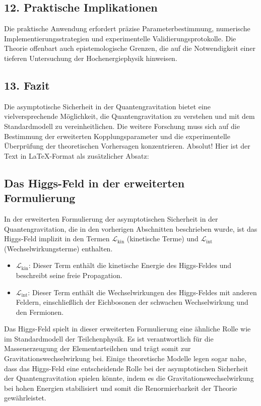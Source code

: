 \documentclass{article}
\begin{document}
\subsection{12. Praktische Implikationen}

Die praktische Anwendung erfordert präzise Parameterbestimmung, numerische Implementierungsstrategien und experimentelle Validierungsprotokolle. Die Theorie offenbart auch epistemologische Grenzen, die auf die Notwendigkeit einer tieferen Untersuchung der Hochenergiephysik hinweisen.

\subsection{13. Fazit}

Die asymptotische Sicherheit in der Quantengravitation bietet eine vielversprechende Möglichkeit, die Quantengravitation zu verstehen und mit dem Standardmodell zu vereinheitlichen. Die weitere Forschung muss sich auf die Bestimmung der erweiterten Kopplungsparameter und die experimentelle Überprüfung der theoretischen Vorhersagen konzentrieren.
Absolut! Hier ist der Text in LaTeX-Format als zusätzlicher Absatz:

\subsection{Das Higgs-Feld in der erweiterten Formulierung}

In der erweiterten Formulierung der asymptotischen Sicherheit in der Quantengravitation, die in den vorherigen Abschnitten beschrieben wurde, ist das Higgs-Feld implizit in den Termen $\mathcal{L}_\text{kin}$ (kinetische Terme) und $\mathcal{L}_\text{int}$ (Wechselwirkungsterme) enthalten.

\begin{itemize}
	\item $\mathcal{L}_\text{kin}$: Dieser Term enthält die kinetische Energie des Higgs-Feldes und beschreibt seine freie Propagation.
	\item $\mathcal{L}_\text{int}$: Dieser Term enthält die Wechselwirkungen des Higgs-Feldes mit anderen Feldern, einschließlich der Eichbosonen der schwachen Wechselwirkung und den Fermionen.
\end{itemize}

Das Higgs-Feld spielt in dieser erweiterten Formulierung eine ähnliche Rolle wie im Standardmodell der Teilchenphysik. Es ist verantwortlich für die Massenerzeugung der Elementarteilchen und trägt somit zur Gravitationswechselwirkung bei. Einige theoretische Modelle legen sogar nahe, dass das Higgs-Feld eine entscheidende Rolle bei der asymptotischen Sicherheit der Quantengravitation spielen könnte, indem es die Gravitationswechselwirkung bei hohen Energien stabilisiert und somit die Renormierbarkeit der Theorie gewährleistet.
\end{document}
